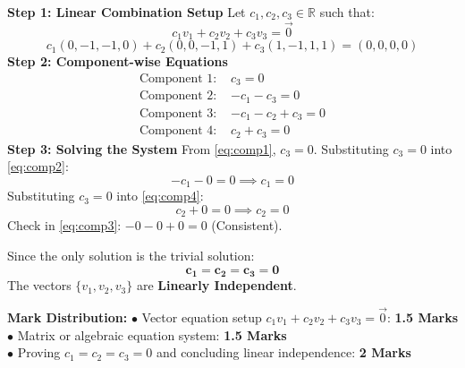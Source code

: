\begin{solutionbox}
\textbf{Step 1: Linear Combination Setup}
Let $c_1, c_2, c_3 \in \mathbb{R}$ such that:
\[
c_1 v_1 + c_2 v_2 + c_3 v_3 = \vec{0}
\]
\[
c_1(0, -1, -1, 0) + c_2(0, 0, -1, 1) + c_3(1, -1, 1, 1) = (0, 0, 0, 0)
\]
\textbf{Step 2: Component-wise Equations}
\begin{align}
\text{Component 1: } & c_3 = 0 \label{eq:comp1} \\
\text{Component 2: } & -c_1 - c_3 = 0 \label{eq:comp2} \\
\text{Component 3: } & -c_1 - c_2 + c_3 = 0 \label{eq:comp3} \\
\text{Component 4: } & c_2 + c_3 = 0 \label{eq:comp4}
\end{align}
\textbf{Step 3: Solving the System}
From \eqref{eq:comp1}, $c_3 = 0$.
Substituting $c_3 = 0$ into \eqref{eq:comp2}:
\[
-c_1 - 0 = 0 \implies c_1 = 0
\]
Substituting $c_3 = 0$ into \eqref{eq:comp4}:
\[
c_2 + 0 = 0 \implies c_2 = 0
\]
Check in \eqref{eq:comp3}: $-0 - 0 + 0 = 0$ (Consistent).

Since the only solution is the trivial solution:
\[
\mathbf{c_1 = c_2 = c_3 = 0}
\]
The vectors $\{v_1, v_2, v_3\}$ are \textbf{Linearly Independent}.

\begin{markingrubric}
\textbf{Mark Distribution:}
$\bullet$ Vector equation setup $c_1 v_1 + c_2 v_2 + c_3 v_3 = \vec{0}$: \textbf{1.5 Marks}\\
$\bullet$ Matrix or algebraic equation system: \textbf{1.5 Marks}\\
$\bullet$ Proving $c_1=c_2=c_3=0$ and concluding linear independence: \textbf{2 Marks}
\end{markingrubric}
\end{solutionbox}

